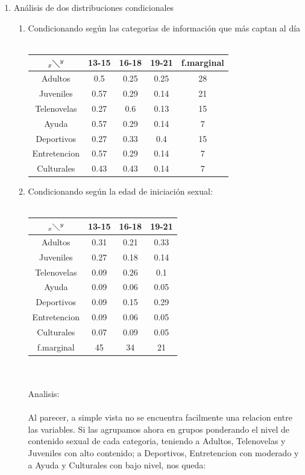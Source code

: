 \documentclass[letterpaper,spanish,11pt]{article}
\begin{document}
\begin{itemize}
\begin{enumerate}
\item An\'alisis de dos distribuciones condicionales \\
\begin{enumerate}
\item Condicionando seg\'un las categorias de informaci\'on que m\'as captan al d\'ia\\\\
	\begin{tabular}[c]{|c|c c c|c|}
        \hline
        $_x\diagdown ^{y}$ & 13-15 & 16-18 & 19-21 & f.marginal \\
        \hline
        Adultos & 0.5 & 0.25 & 0.25 & 28 \\
        Juveniles & 0.57 & 0.29 & 0.14 & 21 \\
        Telenovelas & 0.27 & 0.6 & 0.13 & 15 \\
        Ayuda & 0.57 & 0.29 & 0.14 & 7 \\
        Deportivos & 0.27 & 0.33 & 0.4 & 15 \\
        Entretencion & 0.57 & 0.29 & 0.14 & 7 \\
        Culturales & 0.43 & 0.43 & 0.14 & 7 \\
	\hline
        \end{tabular}

\item Condicionando seg\'un la edad de iniciaci\'on sexual:\\\\
        \begin{tabular}[c]{|c|c c c|}
        \hline
        $_x\diagdown ^{y}$ & 13-15 & 16-18 & 19-21 \\
        \hline
        Adultos & 0.31 & 0.21 & 0.33 \\
        Juveniles & 0.27 & 0.18 & 0.14 \\
        Telenovelas & 0.09 & 0.26 & 0.1 \\
        Ayuda & 0.09 & 0.06 & 0.05 \\
        Deportivos & 0.09 & 0.15 & 0.29 \\
        Entretencion & 0.09 & 0.06 & 0.05 \\
        Culturales & 0.07 & 0.09  & 0.05 \\
	\hline
        f.marginal & 45 & 34 & 21 \\
        \hline
        \end{tabular}
\\\\
Analisis:
\\\\
Al parecer, a simple vista no se encuentra facilmente una relacion entre las variables. Si las agrupamos ahora en grupos ponderando el nivel de contenido sexual de cada categoria, teniendo a Adultos, Telenovelas y Juveniles con alto contenido; a Deportivos, Entretencion con moderado y a Ayuda y Culturales con bajo nivel, nos queda:\\\\


\end{enumerate}
\end{enumerate}
\end{itemize}
\end{document}

